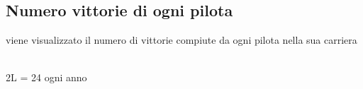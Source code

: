 \documentclass[a4paper,12pt]{report}
\begin{document}
			\subsection{Numero vittorie di ogni pilota}
			viene visualizzato il numero di vittorie compiute da ogni pilota nella sua carriera
			\begin{table}[!htb]
				\centering
				\begin{center}
				\newline\\
				2L = 24 ogni anno\\
				\end{center}
			\end{table}\\
\end{document}
